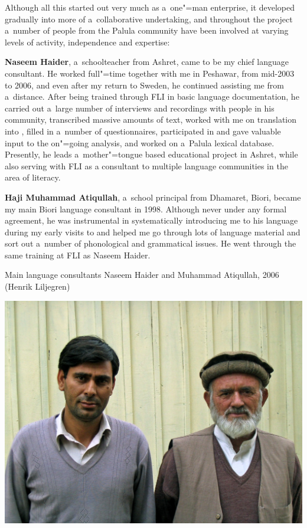 Although all this started out very much as a~one"=man enterprise, it developed gradually into more of
a~collaborative undertaking, and throughout the project a~number of people from the Palula community
have been involved at varying levels of activity, independence and expertise:


\textbf{Naseem Haider}, a~schoolteacher from Ashret, came to be my chief language consultant. He
worked full"=time together with me in Peshawar, from mid-2003 to 2006, and even after my return to
Sweden, he continued assisting me from a~distance. After being trained through FLI in basic language documentation, he carried out a~large number of interviews and
recordings with people in his community, transcribed massive amounts of text, worked with me on
translation into \iliEnglish, filled in a~number of questionnaires, participated in and gave valuable
input to the on"=going analysis, and worked on a~Palula lexical database. Presently, he leads a~mother"=tongue based educational project in Ashret, while also serving with FLI as a consultant to multiple language communities in the area of literacy.


\textbf{Haji Muhammad Atiqullah}, a~school principal from Dhamaret, Biori, became my main Biori language
consultant in 1998. Although never under any formal agreement, he was instrumental in systematically
introducing me to his language during my early visits to \iliChitral and helped me go through lots of
language material and sort out a~number of phonological and grammatical issues. He went through the
same training at FLI as Naseem Haider.

\begin{photofigure}[t]
\caption{Main language consultants Naseem Haider and Muhammad Atiqullah, 2006 (Henrik Liljegren)}
\includegraphics[width=\textwidth]{figures/ch1photo1.jpg}
\end{photofigure}

